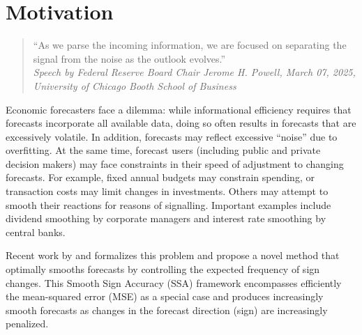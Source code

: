 \documentclass[11pt,a4paper]{article}
\begin{document}
\onehalfspacing
\renewcommand{\thepage}{\arabic{page}} \setcounter{page}{1}
\newpage
\section{Motivation}\label{sec:motivation}

\begin{quote}
    \quad ``As we parse the incoming information, we are focused on separating the signal from the noise as the outlook evolves.''\\
    \textit{Speech by Federal Reserve Board Chair Jerome H. Powell, March 07, 2025, \\
    University of Chicago Booth School of Business}
\end{quote}

Economic forecasters face a dilemma: while informational efficiency requires that forecasts incorporate all available data, doing so often results in forecasts that are excessively volatile. 
In addition, forecasts may reflect excessive ``noise'' due to overfitting. At the same time, forecast users (including public and private decision makers) may face constraints in their speed of adjustment to changing forecasts. For example, fixed annual budgets may constrain spending, or transaction costs may limit changes in investments. Others may attempt to smooth their reactions for reasons of signalling. Important examples include dividend smoothing by corporate managers and interest rate smoothing by central banks.

Recent work by \cite{Wildi2024,Wildi2025} and \cite{McElroy2019,McElroy2020} formalizes this problem and propose a novel method that optimally smooths forecasts by controlling the expected frequency of sign changes. This Smooth Sign Accuracy (SSA) framework encompasses efficiently the mean-squared error (MSE) as a special case and produces increasingly smooth forecasts as changes in the forecast direction (sign) are increasingly penalized. 

\end{document}
